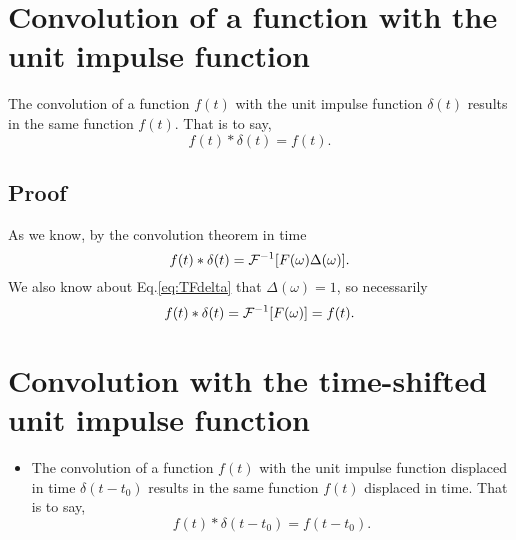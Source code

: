 \section{Convolution of a function with the unit impulse function}

\noindent The convolution of a function $f(t)$ with the unit impulse
function $\delta(t)$ results in the same function $f(t)$. That is to
say,
\begin{equation*}
  f(t)*\delta(t) = f(t).
\end{equation*}

\subsection*{Proof}
\noindent As we know, by the convolution theorem in time
\begin{equation*}
  f(t)*\delta(t)={\cal F}^{-1}[F(\omega)\Delta(\omega)].
\end{equation*}
We also know about Eq.\ref{eq:TFdelta} that $\Delta(\omega)=1$, so necessarily
\begin{equation*}
  f(t)*\delta(t)={\cal F}^{-1}[F(\omega)] = f(t).
\end{equation*}

\section{Convolution with the time-shifted unit impulse function}
\begin{itemize}
\item The convolution of a function $f(t)$ with the unit impulse
  function displaced in time $\delta(t-t_0)$ results in the same
  function $f(t)$ displaced in time. That is to say,
  \begin{equation}
    f(t)*\delta(t-t_0) = f(t-t_0).
    \tag{$f(t)*\delta(t-t_0)$}
    \label{eq:convol_delta}
  \end{equation}
\end{itemize}

